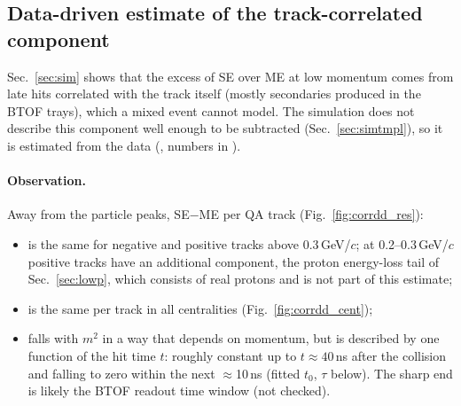 \subsection{Data-driven estimate of the track-correlated component}
\label{sec:corrdd}

Sec.~\ref{sec:sim} shows that the excess of SE over ME at low momentum comes from late hits correlated with the track itself (mostly
secondaries produced in the BTOF trays), which a mixed event cannot model. The simulation does not describe this component well enough to
be subtracted (Sec.~\ref{sec:simtmpl}), so it is estimated from the data (, numbers in
).

\paragraph{Observation.} Away from the particle peaks, SE$-$ME per QA track (Fig.~\ref{fig:corrdd_res}):
\begin{itemize}
\item is the same for negative and positive tracks above 0.3\,GeV/$c$; at 0.2--0.3\,GeV/$c$ positive tracks have an additional
  component, the proton energy-loss tail of Sec.~\ref{sec:lowp}, which consists of real protons and is not part of this estimate;
\item is the same per track in all centralities (Fig.~\ref{fig:corrdd_cent});
\item falls with $m^2$ in a way that depends on momentum, but is described by one function of the hit time $t$: roughly constant up to
  $t\approx40$\,ns after the collision and falling to zero within the next $\approx$10\,ns (fitted $t_0$, $\tau$ below). The sharp end is likely the BTOF readout time window (not checked).
\end{itemize}

